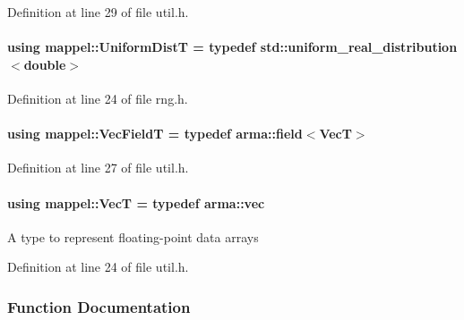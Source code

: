 Definition at line 29 of file util.\+h.

\paragraph[{\texorpdfstring{Uniform\+DistT}{UniformDistT}}]{\setlength{\rightskip}{0pt plus 5cm}using {\bf mappel\+::\+Uniform\+DistT} = typedef std\+::uniform\+\_\+real\+\_\+distribution$<$double$>$}\hypertarget{namespacemappel_ac559959896fbdf3a8ce294353ea41aff}{}\label{namespacemappel_ac559959896fbdf3a8ce294353ea41aff}


Definition at line 24 of file rng.\+h.

\paragraph[{\texorpdfstring{Vec\+FieldT}{VecFieldT}}]{\setlength{\rightskip}{0pt plus 5cm}using {\bf mappel\+::\+Vec\+FieldT} = typedef arma\+::field$<${\bf VecT}$>$}\hypertarget{namespacemappel_a834ec4f32487f07c0ca1e22d4928d1f8}{}\label{namespacemappel_a834ec4f32487f07c0ca1e22d4928d1f8}


Definition at line 27 of file util.\+h.

\paragraph[{\texorpdfstring{VecT}{VecT}}]{\setlength{\rightskip}{0pt plus 5cm}using {\bf mappel\+::\+VecT} = typedef arma\+::vec}\hypertarget{namespacemappel_a2225ad69f358daa3f4f99282a35b9a3a}{}\label{namespacemappel_a2225ad69f358daa3f4f99282a35b9a3a}
A type to represent floating-\/point data arrays 

Definition at line 24 of file util.\+h.



\subsubsection{Function Documentation}
